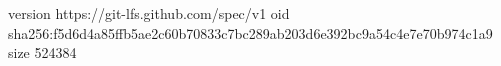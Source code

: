 version https://git-lfs.github.com/spec/v1
oid sha256:f5d6d4a85ffb5ae2c60b70833c7bc289ab203d6e392bc9a54c4e7e70b974c1a9
size 524384
